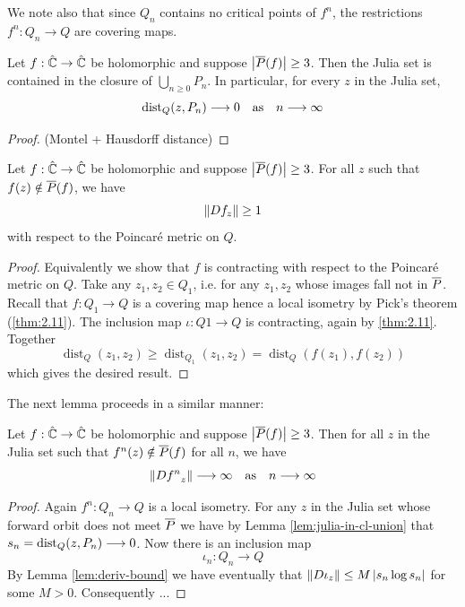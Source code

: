\documentclass[../main.tex]{subfiles}
\newcommand\postcl[1]{\cl{P}\if\relax\detokenize{#1}\relax\else(#1)\fi}
\newcommand\dist[3][]{\operatorname{dist}_{#1}({#2}, {#3})}
\newcommand\deriv[2]{D {#2}_{#1}}
\begin{document}
We note also that since $Q_n$ contains no critical points of $f^n$, the restrictions $f^n : Q_n \to Q$ are covering maps.

\begin{lem}\label{lem:julia-in-cl-union}
Let $f : \hat{\mathbb{C}} \to \hat{\mathbb{C}}$ be holomorphic and suppose $\abs{\postcl{f}} \ge 3$. Then the Julia set is contained in the closure of $\bigcup_{n \ge 0} P_n$. In particular, for every $z$ in the Julia set,
\[
\dist[Q]{z}{P_n} \tendsto 0 \quad\text{as}\quad n \tendsto \infty
\]
\end{lem}
\begin{proof} (Montel + Hausdorff distance) \end{proof}

\begin{lem}\label{lem:deriv-bound}
Let $f : \hat{\mathbb{C}} \to \hat{\mathbb{C}}$ be holomorphic and suppose $\abs{\postcl{f}} \ge 3$. For all $z$ such that $f(z) \notin \postcl{f}$, we have
\[
\norm{\deriv{z}{f}} \ge 1
\]
with respect to the Poincaré metric on $Q$.
\end{lem}
\begin{proof}
Equivalently we show that $f$ is contracting with respect to the Poincaré metric on $Q$. Take any $z_1, z_2 \in Q_1$, i.e. for any $z_1, z_2$ whose images fall not in $\postcl{}$.
Recall that $f : Q_1 \to Q$ is a covering map hence a local isometry by Pick's theorem (\ref{thm:2.11}). The inclusion map $\iota : Q1 \to Q$ is contracting, again by \ref{thm:2.11}. Together
\[
\dist[Q]{z_1}{z_2} \ge \dist[Q_1]{z_1}{z_2} = \dist[Q]{f(z_1)}{f(z_2)}
\]
which gives the desired result.
\end{proof}

The next lemma proceeds in a similar manner:

\begin{lem}
Let $f : \hat{\mathbb{C}} \to \hat{\mathbb{C}}$ be holomorphic and suppose $\abs{\postcl{f}} \ge 3$. Then for all $z$ in the Julia set such that $f^n(z) \notin \postcl{f}$ for all $n$, we have
\[
\norm{\deriv{z}{f^n}} \tendsto \infty
\quad\text{as}\quad n \tendsto \infty
\]
\end{lem}
\begin{proof}
Again $f^n : Q_n \to Q$ is a local isometry. For any $z$ in the Julia set whose forward orbit does not meet $\postcl{}$ we have by Lemma \ref{lem:julia-in-cl-union} that $s_n = \dist[Q]{z}{P_n} \tendsto 0$. Now there is an inclusion map
\[
\iota_n: Q_n \to Q
\]
By Lemma \ref{lem:deriv-bound} we have eventually that $\norm{\deriv{z}{\iota}} \le M \abs{s_n \log s_n}$ for some $M > 0$. Consequently ...
\end{proof}
\end{document}
